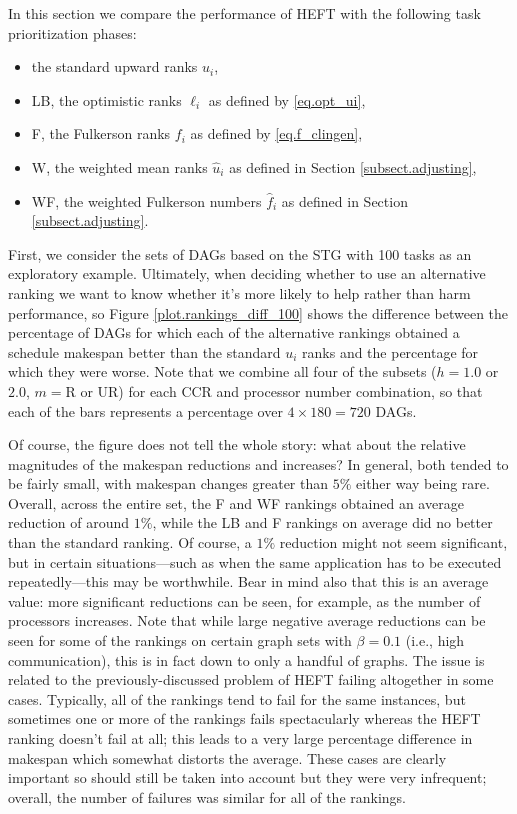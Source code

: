 \documentclass[12pt]{article}
\begin{document}
In this section we compare the performance of HEFT with the following task prioritization phases:
\begin{itemize}
	\item the standard upward ranks $u_i$,
	\item LB, the optimistic ranks $\ell_i$ as defined by \eqref{eq.opt_ui},
	\item F, the Fulkerson ranks $f_i$ as defined by \eqref{eq.f_clingen},
	\item W, the weighted mean ranks $\hat{u}_i$ as defined in Section \ref{subsect.adjusting},
	\item WF, the weighted Fulkerson numbers $\hat{f}_i$ as defined in Section \ref{subsect.adjusting}.
\end{itemize}
First, we consider the sets of DAGs based on the STG with 100 tasks as an exploratory example. Ultimately, when deciding whether to use an alternative ranking we want to know whether it's more likely to help rather than harm performance, so Figure \ref{plot.rankings_diff_100} shows the difference between the percentage of DAGs for which each of the alternative rankings obtained a schedule makespan better than the standard $u_i$ ranks and the percentage for which they were worse. Note that we combine all four of the subsets ($h = 1.0$ or $2.0$, $m = \text{R}$ or UR) for each CCR and processor number combination, so that each of the bars represents a percentage over $4 \times 180 = 720$ DAGs. 

Of course, the figure does not tell the whole story: what about the relative magnitudes of the makespan reductions and increases? In general, both tended to be fairly small, with makespan changes greater than $5\%$ either way being rare. Overall, across the entire set, the F and WF rankings obtained an average reduction of around $1\%$, while the LB and F rankings on average did no better than the standard ranking. Of course, a $1\%$ reduction might not seem significant, but in certain situations---such as when the same application has to be executed repeatedly---this may be worthwhile. Bear in mind also that this is an average value: more significant reductions can be seen, for example, as the number of processors increases. Note that while large negative average reductions can be seen for some of the rankings on certain graph sets with $\beta = 0.1$ (i.e., high communication), this is in fact down to only a handful of graphs. The issue is related to the previously-discussed problem of HEFT failing altogether in some cases. Typically, all of the rankings tend to fail for the same instances, but sometimes one or more of the rankings fails spectacularly whereas the HEFT ranking doesn't fail at all; this leads to a very large percentage difference in makespan which somewhat distorts the average. These cases are clearly important so should still be taken into account but they were very infrequent; overall, the number of failures was similar for all of the rankings.   
\end{document}
